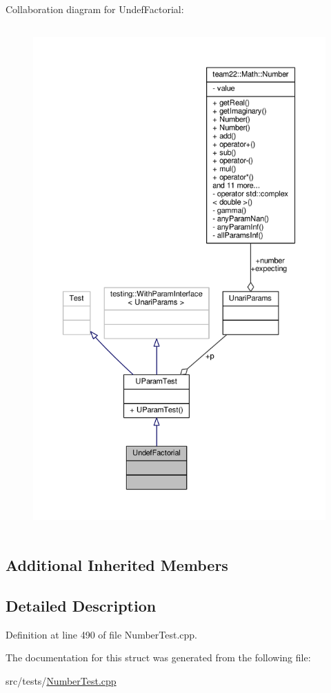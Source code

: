 Collaboration diagram for Undef\+Factorial\+:
\nopagebreak
\begin{figure}[H]
\begin{center}
\leavevmode
\includegraphics[height=550pt]{struct_undef_factorial__coll__graph}
\end{center}
\end{figure}
\subsection*{Additional Inherited Members}


\subsection{Detailed Description}


Definition at line 490 of file Number\+Test.\+cpp.



The documentation for this struct was generated from the following file\+:\begin{DoxyCompactItemize}
\item 
src/tests/\hyperlink{_number_test_8cpp}{Number\+Test.\+cpp}\end{DoxyCompactItemize}
